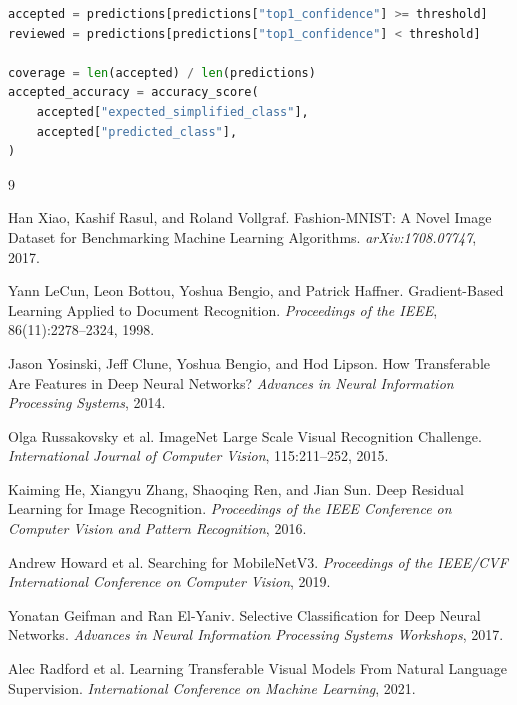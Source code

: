 \documentclass[11pt]{article}
\begin{document}
\begin{lstlisting}[language=Python,caption={Selective prediction policy.}]
accepted = predictions[predictions["top1_confidence"] >= threshold]
reviewed = predictions[predictions["top1_confidence"] < threshold]

coverage = len(accepted) / len(predictions)
accepted_accuracy = accuracy_score(
    accepted["expected_simplified_class"],
    accepted["predicted_class"],
)
\end{lstlisting}

\begin{thebibliography}{9}

Han Xiao, Kashif Rasul, and Roland Vollgraf.
\newblock Fashion-MNIST: A Novel Image Dataset for Benchmarking Machine Learning Algorithms.
\newblock \emph{arXiv:1708.07747}, 2017.

Yann LeCun, Leon Bottou, Yoshua Bengio, and Patrick Haffner.
\newblock Gradient-Based Learning Applied to Document Recognition.
\newblock \emph{Proceedings of the IEEE}, 86(11):2278--2324, 1998.

Jason Yosinski, Jeff Clune, Yoshua Bengio, and Hod Lipson.
\newblock How Transferable Are Features in Deep Neural Networks?
\newblock \emph{Advances in Neural Information Processing Systems}, 2014.

Olga Russakovsky et al.
\newblock ImageNet Large Scale Visual Recognition Challenge.
\newblock \emph{International Journal of Computer Vision}, 115:211--252, 2015.

Kaiming He, Xiangyu Zhang, Shaoqing Ren, and Jian Sun.
\newblock Deep Residual Learning for Image Recognition.
\newblock \emph{Proceedings of the IEEE Conference on Computer Vision and Pattern Recognition}, 2016.

Andrew Howard et al.
\newblock Searching for MobileNetV3.
\newblock \emph{Proceedings of the IEEE/CVF International Conference on Computer Vision}, 2019.

Yonatan Geifman and Ran El-Yaniv.
\newblock Selective Classification for Deep Neural Networks.
\newblock \emph{Advances in Neural Information Processing Systems Workshops}, 2017.

Alec Radford et al.
\newblock Learning Transferable Visual Models From Natural Language Supervision.
\newblock \emph{International Conference on Machine Learning}, 2021.

\end{thebibliography}
\end{document}
